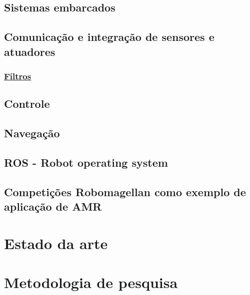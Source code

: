     \subsection{Sistemas embarcados}

    \subsection{Comunicação e integração de sensores e atuadores}

    \subsubsection{\uline{Filtros}}

    \subsection{Controle}

    \subsection{Navegação}

    \subsection{ROS - Robot operating system}

    \subsection{Competições Robomagellan como exemplo de aplicação de AMR}

    \section{\textbf{Estado da arte}}

    \section{\textbf{Metodologia de pesquisa}}

